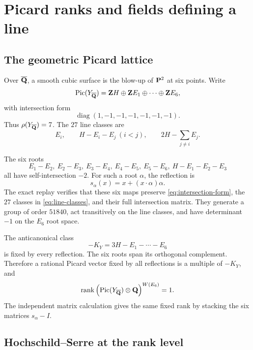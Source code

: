 \section{Picard ranks and fields defining a line}
\label{sec:picard-lines}

\subsection{The geometric Picard lattice}

Over \(\overline{\mathbf Q}\), a smooth cubic surface is the blow-up of \(\mathbf P^2\) at six
points.  Write
\[
 \operatorname{Pic}(Y_{\overline{\mathbf Q}})
 =\mathbf ZH\oplus\mathbf ZE_1\oplus\cdots\oplus\mathbf ZE_6,
\]
with intersection form
\begin{equation}
 \operatorname{diag}(1,-1,-1,-1,-1,-1,-1).
\label{eq:intersection-form}
\end{equation}
Thus \(\rho(Y_{\overline{\mathbf Q}})=7\).  The \(27\) line classes are
\begin{equation}
 E_i,\qquad H-E_i-E_j\ (i<j),\qquad
 2H-\sum_{j\ne i}E_j .
\label{eq:line-classes}
\end{equation}

The six roots
\begin{equation}
 E_1-E_2,\ E_2-E_3,\ E_3-E_4,\ E_4-E_5,\ E_5-E_6,\
 H-E_1-E_2-E_3
\label{eq:simple-roots}
\end{equation}
all have self-intersection \(-2\).  For such a root \(\alpha\), the
reflection is
\begin{equation}
 s_\alpha(x)=x+(x\mathbin{\cdot}\alpha)\alpha.
\label{eq:reflection}
\end{equation}
The exact replay verifies that these six maps preserve
\cref{eq:intersection-form}, the \(27\) classes in
\cref{eq:line-classes}, and their full intersection matrix.  They generate
a group of order \(51840\), act transitively on the line classes, and have
determinant \(-1\) on the \(E_6\) root space.

The anticanonical class
\[
 -K_Y=3H-E_1-\cdots-E_6
\]
is fixed by every reflection.  The six roots span its orthogonal complement.
Therefore a rational Picard vector fixed by all reflections is a multiple of
\(-K_Y\), and
\begin{equation}
 \operatorname{rank}\left(
 \operatorname{Pic}(Y_{\overline{\mathbf Q}})\otimes\mathbf Q
 \right)^{W(E_6)}=1.
\label{eq:weyl-fixed-rank}
\end{equation}
The independent matrix calculation gives the same fixed rank by stacking
the six matrices \(s_\alpha-I\).

\subsection{Hochschild--Serre at the rank level}

